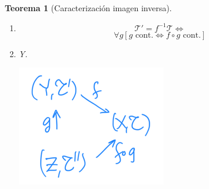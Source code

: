 \documentclass[10pt,a4paper,openright]{book}
\theoremstyle{break}
\newtheorem*{theo}{Teorema}
\begin{document}
\begin{theo}[Caracterización imagen inversa]
\begin{enumerate}
    \item
    \[
    \mathcal{T}' = f^{-1}\mathcal{T} \Leftrightarrow  
    \]
    \begin{equation}
        \forall g \left[ g \text{ cont.} \Leftrightarrow f \circ g \text{ cont.} \right]
    \end{equation}

    \item Y.
    \begin{center}
        \includegraphics[scale=0.3]{images/caracterizacion_img_inv} 
    \end{center}
\end{enumerate}
\end{theo}
\end{document}

